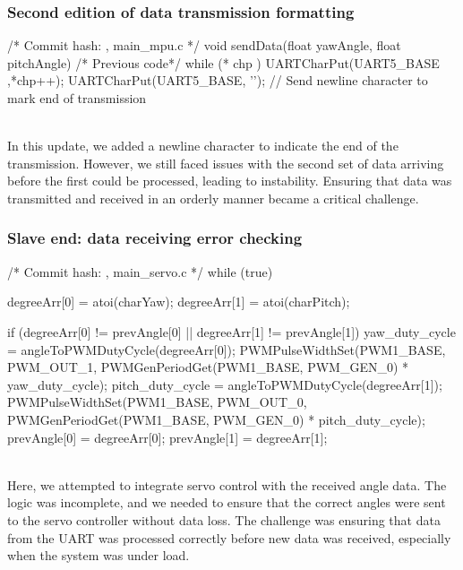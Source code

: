 \documentclass[12pt, a4paper]{article}
\begin{document}
\subsubsection{Second edition of data transmission formatting}\text{}
\begin{code}
/* Commit hash: , main_mpu.c */
void sendData(float yawAngle, float pitchAngle) {
    /* Previous code*/
    while (* chp )
        UARTCharPut(UART5_BASE ,*chp++);
    UARTCharPut(UART5_BASE, '\n'); // Send newline character to mark end of transmission
}
\end{code}
\textbf{}\\
In this update, we added a newline character to indicate the end of the transmission. 
However, we still faced issues with the second set of data arriving before the first could 
be processed, leading to instability. Ensuring that data was transmitted and received in an 
orderly manner became a critical challenge.

\subsubsection{Slave end: data receiving error checking}\text{}
\begin{code}
/* Commit hash: , main_servo.c */
while (true) {
    degreeArr[0] = atoi(charYaw);
    degreeArr[1] = atoi(charPitch);

    if (degreeArr[0] != prevAngle[0] || degreeArr[1] != prevAngle[1]) {
        yaw_duty_cycle = angleToPWMDutyCycle(degreeArr[0]);
        PWMPulseWidthSet(PWM1_BASE, PWM_OUT_1, PWMGenPeriodGet(PWM1_BASE, PWM_GEN_0) * yaw_duty_cycle);
        pitch_duty_cycle = angleToPWMDutyCycle(degreeArr[1]);
        PWMPulseWidthSet(PWM1_BASE, PWM_OUT_0, PWMGenPeriodGet(PWM1_BASE, PWM_GEN_0) * pitch_duty_cycle);
        prevAngle[0] = degreeArr[0];
        prevAngle[1] = degreeArr[1];
    }
}
\end{code}\text{}\\
Here, we attempted to integrate servo control with the received angle data. 
The logic was incomplete, and we needed to ensure that the correct angles were sent to the servo 
controller without data loss. The challenge was ensuring that data from the UART was processed correctly 
before new data was received, especially when the system was under load.
\end{document}
